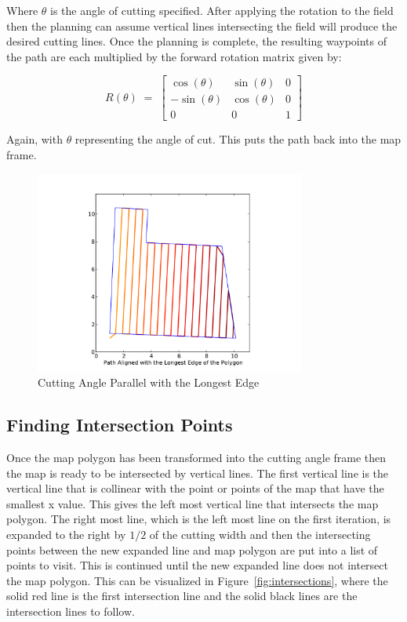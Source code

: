 \documentclass[journal]{IEEEtran}
\begin{document}
  Where $\theta$ is the angle of cutting specified.  After applying the rotation to the field then the planning can assume vertical lines intersecting the field will produce the desired cutting lines.  Once the planning is complete, the resulting waypoints of the path are each multiplied by the forward rotation matrix given by:
  
  $$R\left( \theta  \right)\; =\; \left[ \begin{array}{ccc} \cos \left( \theta  \right) & \sin \left( \theta  \right) & 0 \\ -\sin \left( \theta  \right) & \cos \left( \theta  \right) & 0 \\ 0 & 0 & 1 \end{array} \right]$$
  
  Again, with $\theta$ representing the angle of cut.  This puts the path back into the map frame.
  
  \begin{figure}[here]
    \centering
    \includegraphics[width=3.5in,keepaspectratio]{longest_edge.pdf}
    \caption{Cutting Angle Parallel with the Longest Edge}
    \label{fig:longest_edge}
  \end{figure}
  
  \subsection{Finding Intersection Points}
  Once the map polygon has been transformed into the cutting angle frame then the map is ready to be intersected by vertical lines.  The first vertical line is the vertical line that is collinear with the point or points of the map that have the smallest x value.  This gives the left most vertical line that intersects the map polygon.  The right most line, which is the left most line on the first iteration, is expanded to the right by $1/2$ of the cutting width and then the intersecting points between the new expanded line and map polygon are put into a list of points to visit.  This is continued until the new expanded line does not intersect the map polygon.  This can be visualized in Figure~\ref{fig:intersections}, where the solid red line is the first intersection line and the solid black lines are the intersection lines to follow.
  
\end{document}
